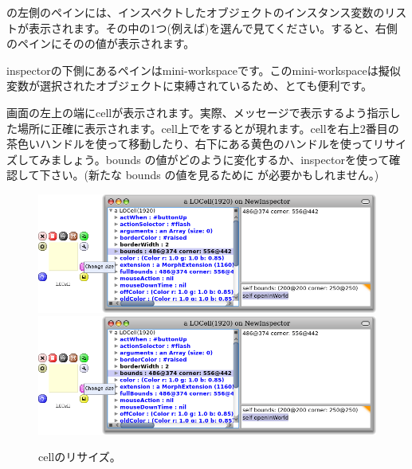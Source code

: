 \documentclass[a4paper,10pt,twoside]{book}
\begin{document}
の左側のペインには、インスペクトしたオブジェクトのインスタンス変数のリストが表示されます。その中の1つ(例えば\mbox{})を選んで見てください。すると、右側のペインにそのの値が表示されます。


inspectorの下側にあるペインはmini-workspaceです。このmini-workspaceは擬似変数\self が選択されたオブジェクトに束縛されているため、とても便利です。


画面の左上の端にcellが表示されます。実際、メッセージで表示するよう指示した場所に正確に表示されます。cell上で\metaclick をするとが現れます。cellを右上2番目の茶色いハンドルを使って移動したり、右下にある黄色のハンドルを使ってリサイズしてみましょう。bounds の値がどのように変化するか、inspectorを使って確認して下さい。(新たな bounds の値を見るために  \actclick が必要かもしれません。)

\begin{figure}[htbp]
\centering
\ifluluelse
	{\includegraphics[width=\textwidth]{LOCellResize} }
	{\includegraphics[scale=0.7]{LOCellResize} }
\caption{cellのリサイズ。}
\end{figure}
\end{document}
